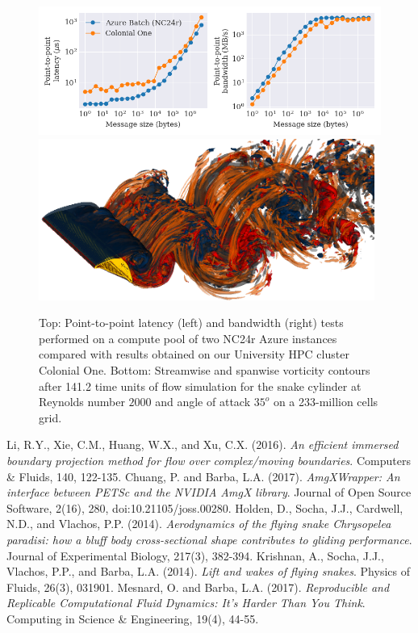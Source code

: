 \documentclass{parcfd2018}
\begin{document}
\begin{figure}[!h]
\centering
\includegraphics[width=14cm]{figures/latencyBandwidthColonialOneAzure.png}
\includegraphics[width=11cm]{figures/wz_wx_wake3d_2k35_meshB_0026.png}
\caption{Top: Point-to-point latency (left) and bandwidth (right) tests performed on a compute pool of two NC24r Azure instances compared with results obtained on our University HPC cluster Colonial One.
Bottom: Streamwise and spanwise vorticity contours after 141.2 time units of flow simulation for the snake cylinder at Reynolds number $2000$ and angle of attack $35^o$ on a 233-million cells grid.}
\label{latency_bandwidth_wz_wx}
\end{figure}

\footnotesize
\begin{thebibliography}{99}
  Li, R.Y., Xie, C.M., Huang, W.X., and Xu, C.X. (2016). \textit{An efficient immersed boundary projection method for flow over complex/moving boundaries}. Computers \& Fluids, 140, 122-135.
  Chuang, P. and Barba, L.A. (2017). \textit{AmgXWrapper: An interface between PETSc and the NVIDIA AmgX library}. Journal of Open Source Software, 2(16), 280, doi:10.21105/joss.00280.
  Holden, D., Socha, J.J., Cardwell, N.D., and Vlachos, P.P. (2014). \textit{Aerodynamics of the flying snake Chrysopelea paradisi: how a bluff body cross-sectional shape contributes to gliding performance}. Journal of Experimental Biology, 217(3), 382-394.
 Krishnan, A., Socha, J.J., Vlachos, P.P., and Barba, L.A. (2014). \textit{Lift and wakes of flying snakes}. Physics of Fluids, 26(3), 031901.
  Mesnard, O. and Barba, L.A. (2017). \textit{Reproducible and Replicable Computational Fluid Dynamics: It's Harder Than You Think}. Computing in Science \& Engineering, 19(4), 44-55.
\end{thebibliography}
\end{document}
